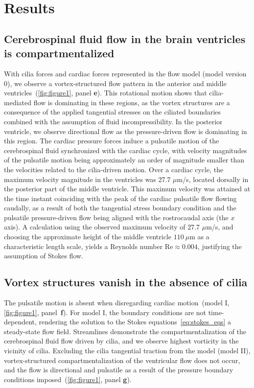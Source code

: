\documentclass[fleqn]{wlscirep}
\begin{document}
\section*{Results}\label{sec:results}
\subsection*{Cerebrospinal fluid flow in the brain ventricles is compartmentalized}
With cilia forces and cardiac forces represented in the flow model (model version 0), we observe a vortex-structured flow pattern in the anterior and middle ventricles~(\cref{fig:figure1}, panel \textbf{e}). This rotational motion shows that cilia-mediated flow is dominating in these regions, as the vortex structures are a consequence of the applied tangential stresses on the ciliated boundaries combined with the assumption of fluid incompressibility. In the posterior ventricle, we observe directional flow as the pressure-driven flow is dominating in this region. The cardiac pressure forces induce a pulsatile motion of the cerebrospinal fluid synchronized with the cardiac cycle, with velocity magnitudes of the pulsatile motion being approximately an order of magnitude smaller than the velocities related to the cilia-driven motion. Over a cardiac cycle, the maximum velocity magnitude in the ventricles was 27.7 $\mu$m/s, located dorsally in the posterior part of the middle ventricle. This maximum velocity was attained at the time instant coinciding with the peak of the cardiac pulsatile flow flowing caudally, as a result of both the tangential stress boundary condition and the pulsatile pressure-driven flow being aligned with the rostrocaudal axis (the $x$ axis). A calculation using the observed maximum velocity of 27.7 $\mu$m/s, and choosing the approximate height of the middle ventricle $110 \ \mu$m as a characteristic length scale, yields a Reynolds number $\mathrm{Re} \approx 0.004$, justifying the assumption of Stokes flow.

\subsection*{Vortex structures vanish in the absence of cilia}
The pulsatile motion is absent when disregarding cardiac motion~(model I, \cref{fig:figure1}, panel~\textbf{f}). For model I, the boundary conditions are not time-dependent, rendering the solution to the Stokes equations~\eqref{eq:stokes_eqs} a steady-state flow field. Streamlines demonstrate the compartmentalization of the cerebrospinal fluid flow driven by cilia, and we observe highest vorticity in the vicinity of cilia. Excluding the cilia tangential traction from the model (model II), vortex-structured compartmentalization of the ventricular flow does not occur, and the flow is directional and pulsatile as a result of the pressure boundary conditions imposed~(\cref{fig:figure1}, panel \textbf{g}). 
\end{document}
